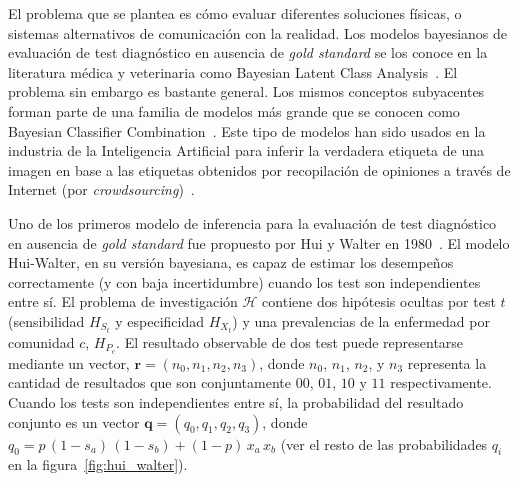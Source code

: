 \documentclass[a4paper,11pt]{book}
\theoremstyle{definition}
\begin{document}

El problema que se plantea es c\'omo evaluar diferentes soluciones f\'isicas, o sistemas alternativos de comunicaci\'on con la realidad.
%
Los modelos bayesianos de evaluaci\'on de test diagn\'ostico en ausencia de \emph{gold standard} se los conoce en la literatura m\'edica y veterinaria como Bayesian Latent Class Analysis~\cite{cheung2021-review, umemneku2019-review}.
%
El problema sin embargo es bastante general.
%
Los mismos conceptos subyacentes forman parte de una familia de modelos m\'as grande que se conocen como Bayesian Classifier Combination~\cite{kim2012-BCC}.
%
Este tipo de modelos han sido usados en la industria de la Inteligencia Artificial para inferir la verdadera etiqueta de una imagen en base a las etiquetas obtenidos por recopilaci\'on de opiniones a trav\'es de Internet (por \emph{crowdsourcing})~\cite{venanzi2014-CBBCC}.


Uno de los primeros modelo de inferencia para la evaluaci\'on de test diagn\'ostico en ausencia de \emph{gold standard} fue propuesto por Hui y Walter en 1980~\cite{hui1980-andWalter}.
%
El modelo Hui-Walter, en su versi\'on bayesiana, es capaz de estimar los desempe\~nos correctamente (y con baja incertidumbre) cuando los test son independientes entre s\'i.
%
El problema de investigaci\'on $\mathcal{H}$ contiene dos hip\'otesis ocultas por test $t$ (sensibilidad $H_{S_t}$ y especificidad $H_{X_t}$) y una prevalencias de la enfermedad por comunidad $c$, $H_{P_c}$.
%
El resultado observable de dos test puede representarse mediante un vector, $\bm{r} = (n_0,n_1,n_2,n_3)$, donde $n_0$, $n_1$, $n_2$, y $n_3$ representa la cantidad de resultados que son conjuntamente $00$, $01$, $10$ y $11$ respectivamente.
%
Cuando los tests son independientes entre s\'i, la probabilidad del resultado conjunto es un vector $\bm{q} = (q_0, q_1, q_2, q_3)$, donde $q_0 = p\,(1-s_a)\,(1-s_b) + (1-p)\, x_a \, x_b$ (ver el resto de las probabilidades $q_i$ en la figura~\ref{fig:hui_walter}).

\end{document}

